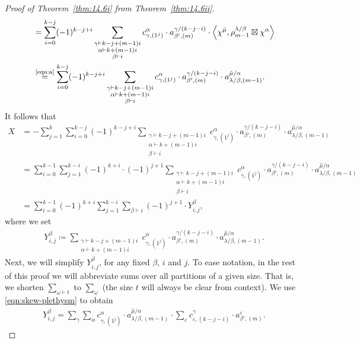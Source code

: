 \begin{proof}[Proof of Theorem~\ref{thm:14.6i} from Theorem~\ref{thm:14.6ii}]
\begin{align*}
		&=\sum_{i=0}^{k-j}(-1)^{k-j+i}\sum_{\substack{\gamma\vdash k-j + (m-1)i\\ \alpha\vdash k+(m-1)i\\ \beta\vdash i}} c^{\alpha}_{\gamma,(1^j)}\cdot a^{\gamma/(k-j-i)}_{\beta',(m)}\cdot \left\langle\chi^{\hat{\mu}},\rho^{\lambda/\beta}_{m-1}\boxtimes\chi^\alpha\right\rangle\\
		&\overset{\normalfont\tiny\text{\eqref{eqn:a}}}{=}\sum_{i=0}^{k-j}(-1)^{k-j+i}\sum_{\substack{\gamma\vdash k-j + (m-1)i\\ \alpha\vdash k+(m-1)i\\ \beta\vdash i}} c^{\alpha}_{\gamma,(1^j)}\cdot a^{\gamma/(k-j-i)}_{\beta',(m)}\cdot a^{\hat{\mu}/\alpha}_{\lambda/\beta,(m-1)}.
	\end{align*}
	It follows that
	\begin{align*}
		X &= -\sum_{j=1}^k \sum_{i=0}^{k-j}(-1)^{k-j+i}\sum_{\substack{\gamma\vdash k-j + (m-1)i\\ \alpha\vdash k+(m-1)i\\ \beta\vdash i}} c^{\alpha}_{\gamma,(1^j)}\cdot a^{\gamma/(k-j-i)}_{\beta',(m)}\cdot a^{\hat{\mu}/\alpha}_{\lambda/\beta,(m-1)}\\
		&= \sum_{i=0}^{k-1} \sum_{j=1}^{k-i} (-1)^{k+i} \cdot (-1)^{j+1} \sum_{\substack{\gamma\vdash k-j + (m-1)i\\ \alpha\vdash k+(m-1)i\\ \beta\vdash i}} c^{\alpha}_{\gamma,(1^j)}\cdot a^{\gamma/(k-j-i)}_{\beta',(m)}\cdot a^{\hat{\mu}/\alpha}_{\lambda/\beta,(m-1)}\\
		&= \sum_{i=0}^{k-1} (-1)^{k+i} \sum_{j=1}^{k-i} \sum_{\beta\vdash i} (-1)^{j+1}\cdot Y^\beta_{i,j},
	\end{align*}
	where we set
	\begin{align*}
		Y^\beta_{i,j}\coloneqq \sum_{\substack{\gamma\vdash k-j + (m-1)i\\ \alpha\vdash k+(m-1)i}} c^{\alpha}_{\gamma,(1^j)}\cdot a^{\gamma/(k-j-i)}_{\beta',(m)}\cdot a^{\hat{\mu}/\alpha}_{\lambda/\beta,(m-1)}.
	\end{align*}
	Next, we will simplify $Y^\beta_{i,j}$, for any fixed $\beta$, $i$ and $j$. To ease notation, in the rest of this proof we will abbreviate sums over all partitions of a given size. That is, we shorten $\sum_{\omega\vdash t}$ to $\sum_\omega$ (the size $t$ will always be clear from context). We use \eqref{eqn:skew-plethysm} to obtain
	\begin{align*}
		Y^\beta_{i,j}=\sum_{\gamma} \sum_\alpha c^\alpha_{\gamma,(1^j)}\cdot a^{\hat{\mu}/\alpha}_{\lambda/\beta,(m-1)} \cdot \sum_\varepsilon c^\gamma_{\varepsilon,(k-j-i)}\cdot a^\varepsilon_{\beta',(m)}.

\end{align*}
\end{proof}
